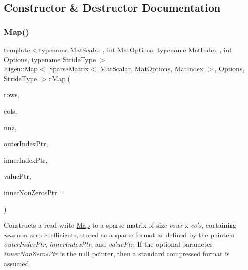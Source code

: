 \subsection{Constructor \& Destructor Documentation}
\mbox{\label{class_eigen_1_1_map_3_01_sparse_matrix_3_01_mat_scalar_00_01_mat_options_00_01_mat_index_01_4_002c859b470cc9e43a031929bd752a93e6_a634ffe6952d21716ca879e107f620f19}} 
\subsubsection{\texorpdfstring{Map()}{Map()}}
{\footnotesize\ttfamily template$<$typename Mat\+Scalar , int Mat\+Options, typename Mat\+Index , int Options, typename Stride\+Type $>$ \\
\mbox{\hyperlink{class_eigen_1_1_map}{Eigen\+::\+Map}}$<$ \mbox{\hyperlink{class_eigen_1_1_sparse_matrix}{Sparse\+Matrix}}$<$ Mat\+Scalar, Mat\+Options, Mat\+Index $>$, Options, Stride\+Type $>$\+::\mbox{\hyperlink{class_eigen_1_1_map}{Map}} (\begin{DoxyParamCaption}\item[{Index}]{rows,  }\item[{Index}]{cols,  }\item[{Index}]{nnz,  }\item[{Storage\+Index $\ast$}]{outer\+Index\+Ptr,  }\item[{Storage\+Index $\ast$}]{inner\+Index\+Ptr,  }\item[{Scalar $\ast$}]{value\+Ptr,  }\item[{Storage\+Index $\ast$}]{inner\+Non\+Zeros\+Ptr = {} }\end{DoxyParamCaption})\hspace{0.3cm}{\ttfamily [inline]}}

Constructs a read-\/write \mbox{\hyperlink{class_eigen_1_1_map}{Map}} to a sparse matrix of size {\itshape rows} x {\itshape cols}, containing {\itshape nnz} non-\/zero coefficients, stored as a sparse format as defined by the pointers {\itshape outer\+Index\+Ptr}, {\itshape inner\+Index\+Ptr}, and {\itshape value\+Ptr}. If the optional parameter {\itshape inner\+Non\+Zeros\+Ptr} is the null pointer, then a standard compressed format is assumed.


